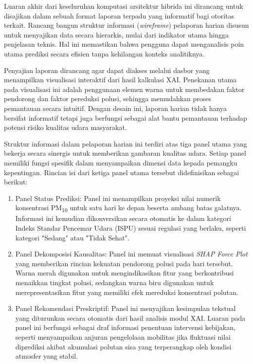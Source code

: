 Luaran akhir dari keseluruhan komputasi arsitektur hibrida ini dirancang untuk disajikan dalam sebuah format laporan terpadu yang informatif bagi otoritas terkait. Rancang bangun struktur informasi (\textit{wireframe}) pelaporan harian disusun untuk menyajikan data secara hierarkis, mulai dari indikator utama hingga penjelasan teknis. Hal ini memastikan bahwa pengguna dapat menganalisis poin utama prediksi secara efisien tanpa kehilangan konteks analitiknya.

Penyajian laporan dirancang agar dapat diakses melalui dasbor yang menampilkan visualisasi interaktif dari hasil kalkulasi XAI. Penekanan utama pada visualisasi ini adalah penggunaan elemen warna untuk membedakan faktor pendorong dan faktor pereduksi polusi, sehingga memudahkan proses pemantauan secara intuitif. Dengan desain ini, laporan harian tidak hanya bersifat informatif tetapi juga berfungsi sebagai alat bantu pemantauan terhadap potensi risiko kualitas udara masyarakat.

Struktur informasi dalam pelaporan harian ini terdiri atas tiga panel utama yang bekerja secara sinergis untuk memberikan gambaran kualitas udara. Setiap panel memiliki fungsi spesifik dalam menyampaikan dimensi data kepada pemangku kepentingan. Rincian isi dari ketiga panel utama tersebut didefinisikan sebagai berikut:

\begin{enumerate}
    \item[(a)] {Panel Status Prediksi:} Panel ini menampilkan proyeksi nilai numerik konsentrasi PM\textsubscript{10} untuk satu hari ke depan beserta ambang batas galatnya. Informasi ini kemudian dikonversikan secara otomatis ke dalam kategori Indeks Standar Pencemar Udara (ISPU) sesuai regulasi yang berlaku, seperti kategori "Sedang" atau "Tidak Sehat".
    \item[(b)] {Panel Dekomposisi Kausalitas:} Panel ini memuat visualisasi \textit{SHAP Force Plot} yang memberikan rincian kekuatan pendorong polusi pada hari tersebut. Warna merah digunakan untuk mengindikasikan fitur yang berkontribusi menaikkan tingkat polusi, sedangkan warna biru digunakan untuk merepresentasikan fitur yang memiliki efek mereduksi konsentrasi polutan.
    \item[(c)] {Panel Rekomendasi Preskriptif:} Panel ini menyajikan kesimpulan tekstual yang diturunkan secara otomatis dari hasil analisis modul XAI. Luaran pada panel ini berfungsi sebagai draf informasi penentuan intervensi kebijakan, seperti menyampaikan anjuran pengelolaan mobilitas jika fluktuasi nilai diprediksi akibat akumulasi polutan sisa yang terperangkap oleh kondisi atmosfer yang stabil.
\end{enumerate}